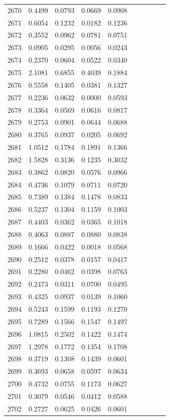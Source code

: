 \begin{table}
\begin{tabular}{cccccccccc}
2670& 0.4499& 0.0793& 0.0669& 0.0908\\ 
2671& 0.6054& 0.1232& 0.0182& 0.1236\\ 
2672& 0.3552& 0.0962& 0.0781& 0.0751\\ 
2673& 0.0905& 0.0295& 0.0056& 0.0243\\ 
2674& 0.2370& 0.0604& 0.0522& 0.0340\\ 
2675& 2.1081& 0.6855& 0.4039& 0.1884\\ 
2676& 0.5558& 0.1405& 0.0381& 0.1327\\ 
2677& 0.2236& 0.0632& 0.0000& 0.0593\\ 
2678& 0.3364& 0.0569& 0.0616& 0.0817\\ 
2679& 0.2753& 0.0901& 0.0644& 0.0688\\ 
2680& 0.3765& 0.0937& 0.0205& 0.0692\\ 
2681& 1.0512& 0.1784& 0.1891& 0.1366\\ 
2682& 1.5828& 0.3136& 0.1235& 0.3032\\ 
2683& 0.3862& 0.0820& 0.0576& 0.0966\\ 
2684& 0.4736& 0.1079& 0.0711& 0.0720\\ 
2685& 0.7389& 0.1384& 0.1478& 0.0833\\ 
2686& 0.5237& 0.1304& 0.1159& 0.1003\\ 
2687& 0.4403& 0.0362& 0.0365& 0.1018\\ 
2688& 0.4063& 0.0887& 0.0880& 0.0838\\ 
2689& 0.1666& 0.0422& 0.0018& 0.0568\\ 
2690& 0.2512& 0.0378& 0.0157& 0.0417\\ 
2691& 0.2280& 0.0462& 0.0398& 0.0763\\ 
2692& 0.2473& 0.0311& 0.0700& 0.0495\\ 
2693& 0.4325& 0.0937& 0.0139& 0.1060\\ 
2694& 0.5243& 0.1599& 0.1193& 0.1270\\ 
2695& 0.7289& 0.1566& 0.1547& 0.1497\\ 
2696& 1.0815& 0.2502& 0.1422& 0.1474\\ 
2697& 1.2978& 0.1772& 0.1354& 0.1708\\ 
2698& 0.3719& 0.1308& 0.1439& 0.0601\\ 
2699& 0.3693& 0.0658& 0.0597& 0.0634\\ 
2700& 0.4732& 0.0755& 0.1173& 0.0627\\ 
2701& 0.3079& 0.0546& 0.0412& 0.0588\\ 
2702& 0.2727& 0.0625& 0.0426& 0.0601\\ 

\end{tabular}
\end{table}
